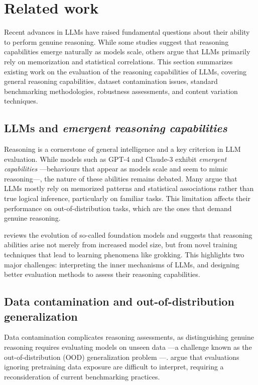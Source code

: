 \section{Related work}
Recent advances in LLMs have raised fundamental questions about their ability to perform genuine reasoning. While some studies suggest that reasoning capabilities emerge naturally as models scale, others argue that LLMs primarily rely on memorization and statistical correlations. This section summarizes existing work on the evaluation of the reasoning capabilities of LLMs, covering general reasoning capabilities, dataset contamination issues, standard benchmarking methodologies, robustness assessments, and content variation techniques.

\subsection{LLMs and \textit{emergent reasoning capabilities}}

Reasoning is a cornerstone of general intelligence and a key criterion in LLM evaluation. While models such as GPT-4 and Claude-3 exhibit \textit{emergent capabilities} —behaviours that appear as models scale and seem to mimic reasoning—, the nature of these abilities remains debated. Many argue that LLMs mostly rely on memorized patterns and statistical associations rather than true logical inference, particularly on familiar tasks. This limitation affects their performance on out-of-distribution tasks, which are the ones that demand genuine reasoning.

\citet{smeaton2024understandingfoundationmodels1924} reviews the evolution of so-called foundation models and suggests that reasoning abilities arise not merely from increased model size, but from novel training techniques that lead to learning phenomena like grokking. This highlights two major challenges: interpreting the inner mechanisms of LLMs, and designing better evaluation methods to assess their reasoning capabilities.

\subsection{Data contamination and out-of-distribution generalization}

Data contamination complicates reasoning assessments, as distinguishing genuine reasoning requires evaluating models on unseen data —a challenge known as the out-of-distribution (OOD) generalization problem \citep{yang2023gluexevaluatingnaturallanguage}—. \citet{razeghi-etal-2022-impact} argue that evaluations ignoring pretraining data exposure are difficult to interpret, requiring a reconsideration of current benchmarking practices.


